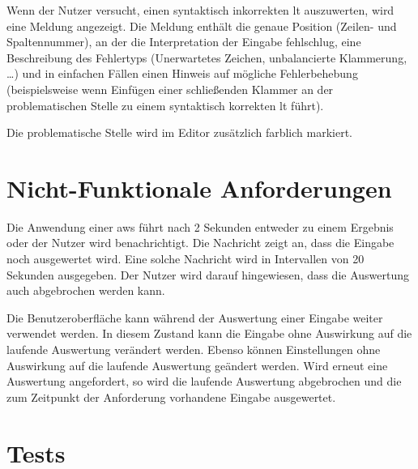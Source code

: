 \documentclass[parskip=full,11pt,twoside]{scrartcl}
\begin{document}
Wenn der Nutzer versucht, einen syntaktisch inkorrekten \gls{lt} auszuwerten,
wird eine Meldung angezeigt. Die Meldung enthält die genaue Position (Zeilen-
und Spaltennummer), an der die Interpretation der Eingabe fehlschlug, eine Beschreibung
des Fehlertyps (Unerwartetes Zeichen, unbalancierte Klammerung, \ldots) und in einfachen
Fällen einen Hinweis auf mögliche Fehlerbehebung (beispielsweise wenn Einfügen einer
schließenden Klammer an der problematischen Stelle zu einem syntaktisch korrekten
\gls{lt} führt).

Die problematische Stelle wird im Editor zusätzlich farblich markiert.


\section{Nicht-Funktionale Anforderungen}


Die Anwendung einer \gls{aws} führt nach 2 Sekunden entweder zu einem Ergebnis oder der Nutzer wird benachrichtigt.
Die Nachricht zeigt an, dass die Eingabe noch ausgewertet wird.
Eine solche Nachricht wird in Intervallen von 20 Sekunden ausgegeben.
Der Nutzer wird darauf hingewiesen, dass die Auswertung auch abgebrochen werden kann.

Die Benutzeroberfläche kann während der Auswertung einer Eingabe weiter verwendet werden.
In diesem Zustand kann die Eingabe ohne Auswirkung auf die laufende Auswertung verändert werden.
Ebenso können Einstellungen ohne Auswirkung auf die laufende Auswertung geändert werden.
Wird erneut eine Auswertung angefordert, so wird die laufende Auswertung abgebrochen und die zum Zeitpunkt der Anforderung vorhandene Eingabe ausgewertet.

\section{Tests}

%
%
%
\end{document}
